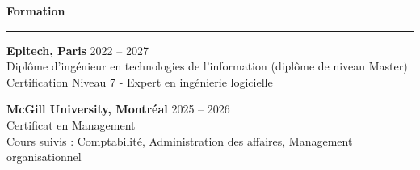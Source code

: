 \documentclass[9pt]{extarticle}
\begin{document}
\par\vspace{8pt}


{\large\bfseries Formation}
\par\vspace{-8pt}
\rule{\linewidth}{0.4pt}
\par\vspace{5pt}

{\bfseries Epitech, Paris} \hfill 2022 -- 2027 \\
Diplôme d'ingénieur en technologies de l'information (diplôme de niveau Master) \\
Certification Niveau 7 - Expert en ingénierie logicielle

\vspace{6pt}

{\bfseries McGill University, Montréal} \hfill 2025 -- 2026 \\
Certificat en Management \\
Cours suivis : Comptabilité, Administration des affaires, Management organisationnel
\end{document}
